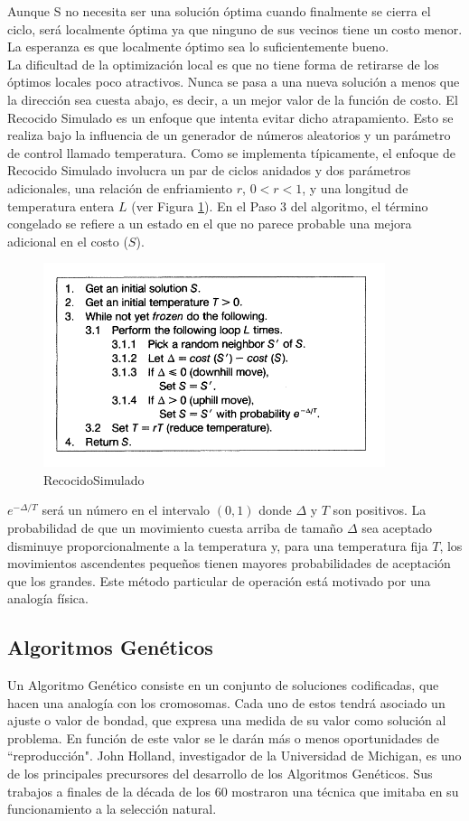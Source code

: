 \documentclass[a4paper,12pt]{book}
\begin{document}
		Aunque S no necesita ser una solución óptima cuando finalmente se cierra el ciclo, será localmente óptima ya que ninguno de sus vecinos tiene un costo menor. La esperanza es que localmente óptimo sea lo suficientemente bueno. \\
		
		La dificultad de la optimización local es que no tiene forma de retirarse de los óptimos locales poco atractivos. Nunca se pasa a una nueva solución a menos que la dirección sea cuesta abajo, es decir, a un mejor valor de la función de costo. El Recocido Simulado es un enfoque que intenta evitar dicho atrapamiento. Esto se realiza bajo la influencia de un generador de números aleatorios y un parámetro de control llamado temperatura. Como se implementa típicamente, el enfoque de Recocido Simulado involucra un par de ciclos anidados y dos parámetros adicionales, una relación de enfriamiento $r$, $0 < r <1$, y una longitud de temperatura entera $L$ (ver Figura \ref{RecocidoSimulado}). En el Paso 3 del algoritmo, el término congelado se refiere a un estado en el que no parece probable una mejora adicional en el costo ($S$).
		
		\begin{figure}[h]
		\centering
		\includegraphics[width=10cm]{./Graphics/RecocidoSimulado.png}
		\caption{RecocidoSimulado}
		\label{RecocidoSimulado}
		\end{figure}
		
		$e ^{-\Delta / T}$ será un número en el intervalo $(0, 1)$ donde $\Delta$ y $T$ son positivos. La probabilidad de que un movimiento cuesta arriba de tamaño $\Delta$ sea aceptado disminuye proporcionalmente a la temperatura y, para una temperatura fija $T$, los movimientos ascendentes pequeños tienen mayores probabilidades de aceptación que los grandes. Este método particular de operación está motivado por una analogía física.
		
	\subsection{Algoritmos Genéticos}
		Un Algoritmo Genético \cite{AlgGen} consiste en un conjunto de soluciones codificadas, que hacen una analogía con los cromosomas.  Cada uno  de  estos tendrá  asociado  un  ajuste o valor de bondad, que expresa una medida de su valor como solución al problema. En función de este valor se le darán más o menos oportunidades de ``reproducción". John Holland, investigador de la Universidad de Michigan, es uno de los principales precursores del desarrollo de los Algoritmos Genéticos. Sus trabajos a finales de la década de los 60 mostraron una técnica que imitaba en su funcionamiento a la selección natural.
		
\end{document}
